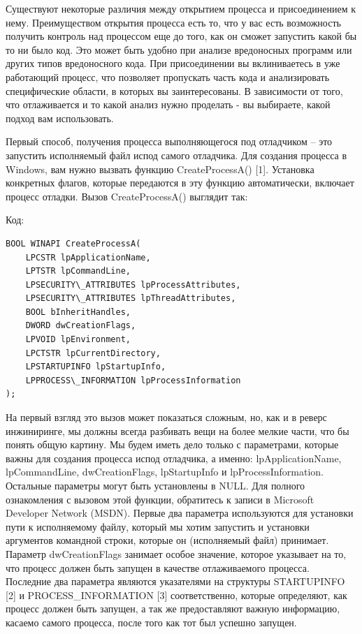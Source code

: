 \documentclass[12pt]{book}
\begin{document}
Существуют некоторые различия между открытием процесса и присоединением к нему. Преимуществом открытия процесса есть то, что у вас есть возможность получить контроль над процессом еще до того, как он сможет запустить какой бы то ни было код. Это может быть удобно при анализе вредоносных программ или других типов вредоносного кода. При присоединении вы вклиниваетесь в уже работающий процесс, что позволяет пропускать часть кода и анализировать специфические области, в которых вы заинтересованы. В зависимости от того, что отлаживается и то какой анализ нужно проделать - вы выбираете, какой подход вам использовать.

Первый способ, получения процесса выполняющегося под отладчиком – это запустить исполняемый файл испод самого отладчика. Для создания процесса в Windows, вам нужно вызвать функцию CreateProcessA() [1]. Установка конкретных флагов, которые передаются в эту функцию автоматически, включает процесс отладки. Вызов CreateProcessA() выглядит так:

Код:
\begin{lstlisting}
BOOL WINAPI CreateProcessA(
    LPCSTR lpApplicationName,
    LPTSTR lpCommandLine,
    LPSECURITY\_ATTRIBUTES lpProcessAttributes,
    LPSECURITY\_ATTRIBUTES lpThreadAttributes,
    BOOL bInheritHandles,
    DWORD dwCreationFlags,
    LPVOID lpEnvironment,
    LPCTSTR lpCurrentDirectory,
    LPSTARTUPINFO lpStartupInfo,
    LPPROCESS\_INFORMATION lpProcessInformation
);
\end{lstlisting}

На первый взгляд это вызов может показаться сложным, но, как и в реверс инжиниринге, мы должны всегда разбивать вещи на более мелкие части, что бы понять общую картину. Мы будем иметь дело только с параметрами, которые важны для создания процесса испод отладчика, а именно: lpApplicationName, lpCommandLine, dwCreationFlags, lpStartupInfo и lpProcessInformation. Остальные параметры могут быть установлены в NULL. Для полного ознакомления с вызовом этой функции, обратитесь к записи в Microsoft Developer Network (MSDN). Первые два параметра используются для установки пути к исполняемому файлу, который мы хотим запустить и установки аргументов командной строки, которые он (исполняемый файл) принимает. Параметр dwCreationFlags занимает особое значение, которое указывает на то, что процесс должен быть запущен в качестве отлаживаемого процесса. Последние два параметра являются указателями на структуры STARTUPINFO [2] и PROCESS\_INFORMATION [3] соответственно, которые определяют, как процесс должен быть запущен, а так же предоставляют важную информацию, касаемо самого процесса, после того как тот был успешно запущен.
\end{document}
